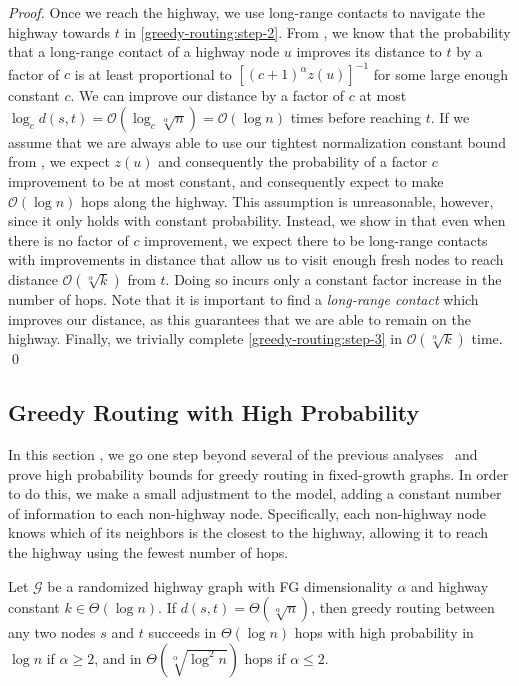 \begin{proof}
    Once we reach the highway, we use long-range contacts to navigate the highway
    towards $t$ in \cref{greedy-routing:step-2}.
    From , we know that the probability that a long-range
    contact of a highway node $u$ improves its distance to $t$ by a
    factor of $c$ is at least proportional to $[(c + 1)^\alpha z(u)]^{-1}$ for some
    large enough constant $c$.
    We can improve our distance by a factor of $c$ at most $\log_c{d(s, t)} =
    \mathcal{O}(\log_c{\sqrt[\alpha]{n}}) = \mathcal{O}(\log{n})$ times
    before reaching $t$.
    If we assume that we are always able to use our tightest normalization
    constant bound from , we expect $z(u)$ and
    consequently the probability of a factor $c$ improvement to be at most
    constant, and consequently expect to make $\mathcal{O}(\log{n})$ hops along
    the highway.
    This assumption is unreasonable, however, since it only holds with constant
    probability.
    Instead, we show in  that even when there is no factor of $c$
    improvement, we expect there to be long-range contacts with
    improvements in distance that allow us to visit enough fresh nodes to reach
    distance $\mathcal{O}(\sqrt[\alpha]{k})$ from $t$.
    Doing so incurs only a constant factor increase in the number of hops.
    Note that it is important to find a \textit{long-range contact} which
    improves our distance, as this guarantees that we are able to remain on the
    highway.
    Finally, we trivially complete \cref{greedy-routing:step-3} in
    $\mathcal{O}(\sqrt[\alpha]{k})$ time.
    \qed
\end{proof}

\subsection{Greedy Routing with High Probability}
%
In this section
, we go one step beyond several of the previous
analyses~\cite{kleinberg2000small,martel,gila2023highway} and 
prove high
probability bounds for greedy routing in fixed-growth graphs.
In order to do this, we make a small adjustment to the model, adding a constant
number of information to each non-highway node.
Specifically, each non-highway node knows which of its neighbors is the closest
to the highway, allowing it to reach the highway using the fewest number of
hops.
%
\begin{theorem} \label{thm:greedy-routing-hp}
    Let $\mathcal{G}$ be a randomized highway graph with FG dimensionality
    $\alpha$ and highway constant $k \in \Theta(\log{n})$.
    If $d(s, t) =
    \Theta(\sqrt[\alpha]{n})$, then
    greedy routing between any two nodes $s$ and $t$ succeeds in $\Theta(\log{n})$ hops with high
    probability in $\log{n}$ if $\alpha \geq 2$, and in
    $\Theta(\sqrt[\alpha]{\log^2{n}})$ hops if $\alpha \leq 2$.
\end{theorem}

